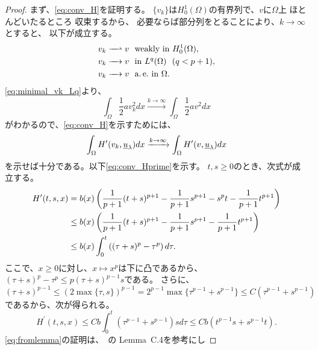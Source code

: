 \begin{proof}
 まず、\eqref{eq:conv_H}を証明する。
 $\{ v_k \}$は$H_0^1(\Omega)$の有界列で、$v$に$\Omega$上
 ほとんどいたるところ
 収束するから、
 必要ならば部分列をとることにより、$k \to \infty$とすると、
 以下が成立する。
 \begin{align}
  v_k \xrightharpoonup{ \mbox{ ~ } } v & \ \ \text{weakly~} \tin
  H_0^1(\Omega), \label{eq:minimal_vk_weakly} \\
  v_k \xrightarrow{ \mbox{ ~ } } v & \ \ \tin L^q(\Omega) \ \
   (q < p+1), \label{eq:minimal_vk_Lq} \\
  v_k \xrightarrow{ \mbox{ ~ } } v & \ \ \ae \tin \Omega. 
    \label{eq:minimal_vk_ae}
 \end{align}
 \eqref{eq:minimal_vk_Lq}より、
 \[
  \int_\Omega \frac{1}{2} a v_k^2 dx \xrightarrow{k \to \infty}
 \int_\Omega \frac{1}{2}av^2 dx
 \]
 がわかるので、\eqref{eq:conv_H}を示すためには、
 \begin{equation}
  \int_\Omega H^\prime(v_k, \underline{u}_\lambda)dx \xrightarrow{ k \to \infty } 
  \int_\Omega H^\prime(v, \underline{u}_\lambda)dx \label{eq:conv_Hprime} \\  
 \end{equation}
 を示せば十分である。以下\eqref{eq:conv_Hprime}を示す。
 $t, s \geq 0$のとき、次式が成立する。
 \begin{align}
  H^\prime(t, s, x) &= b(x) \left( \frac{1}{p+1}(t+s)^{p+1} -
  \frac{1}{p+1} s^{p+1} - s^p t - \frac{1}{p+1} t^{p+1} \right) \notag \\
  & \leq b(x) \left( \frac{1}{p+1}(t+s)^{p+1} - \frac{1}{p+1}s^{p+1} -
  \frac{1}{p+1} t^{p+1}\right) \notag \\
  & \leq b(x) \int_0^t \left( (\tau + s)^p - \tau^p \right)
  d\tau. \label{eq:dtau} 
 \end{align}
 ここで、$x \geq 0$に対し、$x \mapsto x^p$は下に凸であるから、
 $(\tau + s)^p - \tau^p \leq p(\tau + s)^{p-1} s$である。
 さらに、
 \begin{equation}
  (\tau + s)^{p-1} \leq (2 \max\{\tau , s\})^{p-1} = 2^{p-1} \max \{
   \tau^{p-1} + s^{p-1} \} \leq C (\tau^{p-1} + s^{p-1}) \label{eq:taus2p-1}
 \end{equation}
 であるから、次が得られる。
 \begin{equation}
  H^\prime(t, s, x) \leq C b \int_0^t (\tau^{p-1} + s^{p-1}) s d \tau
   \leq C b ( t^{p-1} s + s^{p-1} t). \label{eq:fromlemma}
 \end{equation}
 \eqref{eq:fromlemma}の証明は、\cite{MR2317491}~の Lemma~C.4を参考にし

\end{proof}
